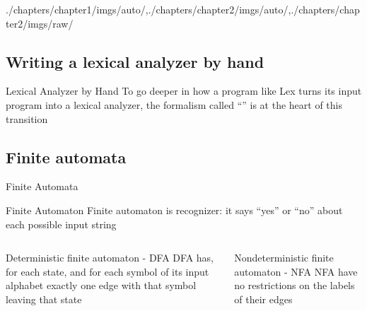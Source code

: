 \begin{graphicspathcontext}{{./chapters/chapter1/imgs/auto/},{./chapters/chapter2/imgs/auto/},{./chapters/chapter2/imgs/raw/}}
\begin{bibunit}[apalike]
\section[Lexical analyzer by hand]{Writing a lexical analyzer by hand}
\sectiontableofcontentslide

\begin{frame}[background=6]{Lexical Analyzer by Hand}
	To go deeper in how a program like Lex turns its input program into a lexical analyzer, the formalism called ``'' is at the heart of this transition
\end{frame}

\subsection{Finite automata}
\subsectiontableofcontentslide

\begin{frame}{Finite Automata}
	\begin{definitionblock}{Finite Automaton}
		Finite automaton is recognizer: it says ``yes'' or ``no'' about each possible input string
	\end{definitionblock}
	\begin{columns}
		\begin{column}[t]{.5\linewidth}
			\begin{block}{Deterministic finite automaton - DFA}
				DFA has, for each state, and for each symbol of its input alphabet exactly one edge with that symbol leaving that state
			\end{block}
		\end{column}
		\begin{column}[t]{.5\linewidth}
			\begin{block}{Nondeterministic finite automaton - NFA}
				NFA have no restrictions on the labels of their edges
			\end{block}
		\end{column}
	\end{columns}
	\vspace{.5cm}
\end{frame}


\end{bibunit}
\end{graphicspathcontext}

